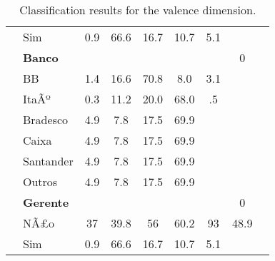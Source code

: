\documentclass[10pt,a4paper]{article}
\begin{document}
\begin{table*}[t]
\begin{tabular}{c c c c c c c c c}
                \multicolumn{1}{c}{}    &
                \multicolumn{1}{l}{Sim}& 0.9 & 66.6 & 16.7 & 10.7 & 5.1  \\ \cmidrule{1-8} &
                \multicolumn{1}{l}{\textbf{Banco}} &  &  &  &  &  & 0 \\ \cmidrule{1-8}                
                \multicolumn{1}{c}{}    &
                \multicolumn{1}{l}{BB} &1.4 & 16.6 & 70.8 & 8.0 & 3.1  \\
                \multicolumn{1}{c}{}    &   
                \multicolumn{1}{l}{ItaÃº} &0.3 & 11.2 & 20.0 & 68.0 & .5  \\
                \multicolumn{1}{c}{}    &
                \multicolumn{1}{l}{Bradesco} & 4.9 & 7.8 & 17.5 & 69.9  \\
                \multicolumn{1}{c}{}    &
                \multicolumn{1}{l}{Caixa} & 4.9 & 7.8 & 17.5 & 69.9  \\
                \multicolumn{1}{c}{}    &
                \multicolumn{1}{l}{Santander} & 4.9 & 7.8 & 17.5 & 69.9  \\
                \multicolumn{1}{c}{}    &
                \multicolumn{1}{l}{Outros} & 4.9 & 7.8 & 17.5 & 69.9  \\ \cmidrule{1-8} &
                \multicolumn{1}{l}{\textbf{Gerente}} &  &  &  &  &  & 0 \\ \cmidrule{1-8}
                \multicolumn{1}{c}{}    &
                \multicolumn{1}{l}{NÃ£o} & 37 & 39.8 & 56 & 60.2 & 93 & 48.9 &  \\
                \multicolumn{1}{c}{}    &
                \multicolumn{1}{l}{Sim}& 0.9 & 66.6 & 16.7 & 10.7 & 5.1  \\
                \midrule
                \bottomrule
        \end{tabular}
        \centering
        \caption{Classification results for the valence dimension.}
        \label{tab:sam_count}
\end{table*}
\end{document}
